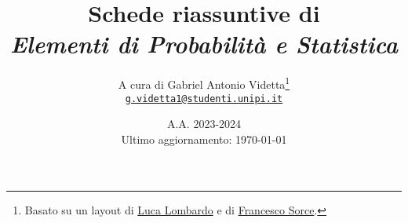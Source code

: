 \documentclass[10pt]{report}
\title{\Huge{Schede riassuntive di \\ \textit{Elementi di Probabilità e Statistica}}}
\date{A.A. 2023-2024 \\[0.6in] Ultimo aggiornamento: \today}
\author{A cura di Gabriel Antonio Videtta\footnote{Basato su un layout di \underline{Luca Lombardo} e di \underline{Francesco Sorce}.} \\ \href{mailto:g.videtta1@studenti.unipi.it}{\texttt{g.videtta1@studenti.unipi.it}}}
\begin{document}
\maketitle

\begin{multicols*}{2}
    \tableofcontents
\end{multicols*}

\newpage







\end{document}
